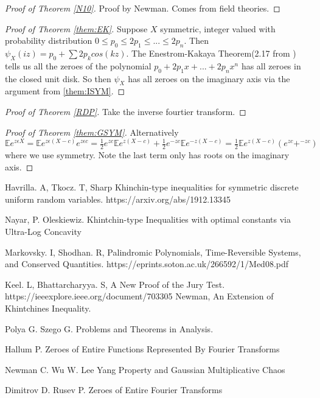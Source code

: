 \documentclass[10pt]{article}
\newcommand{\E}{\mathbb{E}}
\newcommand{\1}{\textbf{1}}
\theoremstyle{remark}
\theoremstyle{definition}
\begin{document}
\begin{proof}[Proof of Theorem \ref{N10}]
	Proof by Newman. Comes from field theories.
\end{proof}


\begin{proof}[Proof of Theorem \ref{them:EK}]
	Suppose $X$ symmetric, integer valued with probability distribution $0 \leq p_0 \leq 2p_1 \leq ... \leq 2p_n$. Then $\psi_X(iz) = p_0 + \sum 2p_k cos(kz)$. The Enestrom-Kakaya Theorem(2.17 from \cite{HP}) tells us all the zeroes of the polynomial $p_0 +2p_1x+...+2p_nx^n$ has all zeroes in the closed unit disk. So then $\psi_X$ has all zeroes on the imaginary axis via the argument from \ref{them:ISYM}.
\end{proof}

\begin{proof}[Proof of Theorem \ref{RDP}]
	Take the inverse fourtier transform.
\end{proof}

\begin{proof}[Proof of Theorem \ref{them:GSYM}]

	Alternatively $\E e^{z \epsilon X} = \E e^{z\epsilon (X-c)}e^{z\epsilon c} = \frac{1}{2}e^{zc}\E e^{z(X-c)}+\frac{1}{2}e^{-zc}\E e^{-z(X-c)} = \frac{1}{2}\E e^{z(X-c)}(e^{zc}+^{-zc})$ where we use symmetry. Note the last term only has roots on the imaginary axis.
\end{proof}


\begin{thebibliography}{9}

 Havrilla. A, Tkocz. T, Sharp Khinchin-type inequalities for symmetric discrete uniform random variables. https://arxiv.org/abs/1912.13345

 Nayar, P. Oleskiewiz. Khintchin-type Inequalities with optimal constants via Ultra-Log Concavity


 Markovsky. I, Shodhan. R,
Palindromic Polynomials, Time-Reversible Systems, and Conserved Quantities. https://eprints.soton.ac.uk/266592/1/Med08.pdf

 Keel. L, Bhattarcharyya. S,
A New Proof of the Jury Test. https://ieeexplore.ieee.org/document/703305
 Newman, An Extension of Khintchines Inequality. 

 Polya G. Szego G. Problems and Theorems in Analysis. 

 Hallum P. Zeroes of Entire Functions Represented By Fourier Transforms

 Newman C. Wu W. Lee Yang Property and Gaussian Multiplicative Chaos

 Dimitrov D. Rusev P. Zeroes of Entire Fourier Transforms

\end{thebibliography}
\end{document}
